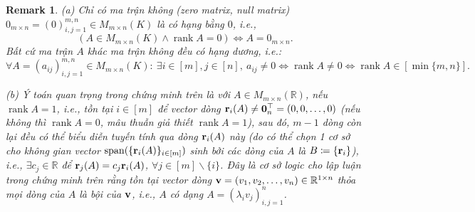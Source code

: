 \documentclass{article}
\newtheorem{remark}{Remark}
\begin{document}
\begin{remark}
	(a) Chỉ có ma trận không (zero matrix, null matrix) $0_{m\times n} = (0)_{i,j=1}^{m,n}\in M_{m\times n}(K)$ là có hạng bằng $0$, i.e.,
	\begin{equation*}
		(A\in M_{m\times n}(K)\land\operatorname{rank}A = 0)\Leftrightarrow A = 0_{m\times n}.
	\end{equation*}
	Bất cứ ma trận $A$ khác ma trận không đều có hạng dương, i.e.:
	\begin{equation*}
		\forall A = (a_{ij})_{i,j=1}^{m,n}\in M_{m\times n}(K):\ \exists i\in[m],j\in[n],\ a_{ij}\ne0\Leftrightarrow\operatorname{rank}A\ne0\Leftrightarrow\operatorname{rank}A\in[\min\{m,n\}].
	\end{equation*}
	\item(b) Ý toán quan trọng trong chứng minh trên là với $A\in M_{m\times n}(\mathbb{R})$, nếu $\operatorname{rank}A = 1$, i.e., tồn tại $i\in[m]$ để vector dòng ${\bf r}_i(A)\ne{\bf0}_n^\top = (0,0,\ldots,0)$ (nếu không thì $\operatorname{rank}A = 0$, mâu thuẫn giả thiết $\operatorname{rank}A = 1$), sau đó, $m - 1$ dòng còn lại đều có thể biểu diễn tuyến tính qua dòng ${\bf r}_i(A)$ này (do có thể chọn 1 cơ sở cho không gian vector ${\rm span}(\{{\bf r}_i(A)\}_{i\in[m]})$ sinh bởi các dòng của $A$ là $B\coloneqq\{{\bf r}_i\}$), i.e., $\exists c_j\in\mathbb{R}$ để ${\bf r}_j(A) = c_j{\bf r}_i(A)$, $\forall j\in[m]\backslash\{i\}$. Đây là cơ sở logic cho lập luận trong chứng minh trên rằng tồn tại vector dòng ${\bf v} = (v_1,v_2,\ldots,v_n)\in\mathbb{R}^{1\times n}$ thỏa mọi dòng của $A$ là bội của ${\bf v}$, i.e., $A$ có dạng $A = (\lambda_iv_j)_{i,j=1}^n$.
	

\end{remark}
\end{document}

